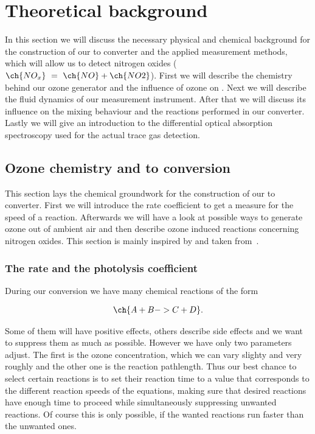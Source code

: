 \section{Theoretical background}
\label{sec:theory}

In this section we will discuss the necessary physical and chemical
background for the construction of our  to  converter
and the applied measurement methods, which will allow us to detect
nitrogen oxides ($\ch{NO_x}\ =\ \ch{NO} + \ch{NO2}$). First we will
describe the chemistry behind our ozone generator and the influence of
ozone on . Next we will describe the fluid dynamics of our
measurement instrument. After that we will discuss its influence on
the mixing behaviour and the reactions performed in our
converter. Lastly we will give an introduction to the differential
optical absorption spectroscopy used for the actual trace gas
detection.

\subsection{Ozone chemistry and  to  conversion}
\label{sec:chemistry}

This section lays the chemical groundwork for the construction of our
 to  converter. First we will introduce the rate
coefficient to get a measure for the speed of a reaction. Afterwards
we will have a look at possible ways to generate ozone out of ambient
air and then describe ozone induced reactions concerning
nitrogen oxides. This section is mainly inspired by and taken
from~\cite{bsc}.

\subsubsection{The rate and the photolysis coefficient}
\label{sec:rate}

During our conversion we have many chemical reactions of the form

\begin{align}
  \ch{A + B -> C + D}. \label{eq:prototype}
\end{align}

Some of them will have positive effects, others describe side
effects and we want to suppress them as much as possible. However we
have only two parameters adjust. The first is the ozone
concentration, which we can vary slighty and very roughly and the
other one is the reaction pathlength. Thus our best chance to
select certain reactions is to set their reaction time to a value that
corresponds to the different reaction speeds of the equations, making
sure that desired reactions have enough time to proceed while
simultaneously suppressing unwanted reactions. Of
course this is only possible, if the wanted reactions run faster than
the unwanted ones.

